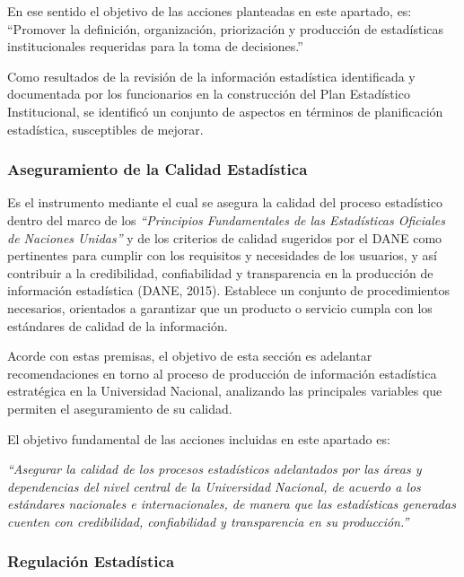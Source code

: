 \documentclass[
]{book}
\begin{document}
En ese sentido el objetivo de las acciones planteadas en este apartado, es: ``Promover la definición, organización, priorización y producción de estadísticas institucionales requeridas para la toma de decisiones.''

Como resultados de la revisión de la información estadística identificada y documentada por los funcionarios en la construcción del Plan Estadístico Institucional, se identificó un conjunto de aspectos en términos de planificación estadística, susceptibles de mejorar.

\hypertarget{aseguramiento-de-la-calidad-estaduxedstica}{%
\subsubsection{Aseguramiento de la Calidad Estadística}\label{aseguramiento-de-la-calidad-estaduxedstica}}

Es el instrumento mediante el cual se asegura la calidad del proceso estadístico dentro del marco de los \emph{``Principios Fundamentales de las Estadísticas Oficiales de Naciones Unidas''} y de los criterios de calidad sugeridos por el DANE como pertinentes para cumplir con los requisitos y necesidades de los usuarios, y así contribuir a la credibilidad, confiabilidad y transparencia en la producción de información estadística (DANE, 2015). Establece un conjunto de procedimientos necesarios, orientados a garantizar que un producto o servicio cumpla con los estándares de calidad de la información.

Acorde con estas premisas, el objetivo de esta sección es adelantar recomendaciones en torno al proceso de producción de información estadística estratégica en la Universidad Nacional, analizando las principales variables que permiten el aseguramiento de su calidad.

El objetivo fundamental de las acciones incluidas en este apartado es:

\emph{``Asegurar la calidad de los procesos estadísticos adelantados por las áreas y dependencias del nivel central de la Universidad Nacional, de acuerdo a los estándares nacionales e internacionales, de manera que las estadísticas generadas cuenten con credibilidad, confiabilidad y transparencia en su producción.''}

\hypertarget{regulaciuxf3n-estaduxedstica}{%
\subsubsection{Regulación Estadística}\label{regulaciuxf3n-estaduxedstica}}
\end{document}
